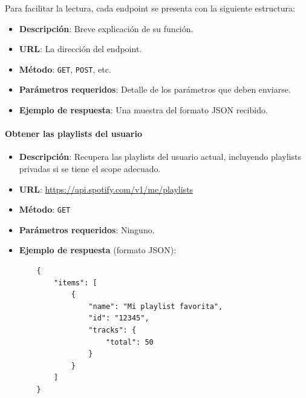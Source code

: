 Para facilitar la lectura, cada endpoint se presenta con la siguiente estructura:
\begin{itemize}
    \item \textbf{Descripción}: Breve explicación de su función.
    \item \textbf{URL}: La dirección del endpoint.
    \item \textbf{Método}: \texttt{GET}, \texttt{POST}, etc.
    \item \textbf{Parámetros requeridos}: Detalle de los parámetros que deben enviarse.
    \item \textbf{Ejemplo de respuesta}: Una muestra del formato JSON recibido.
\end{itemize}

\paragraph{Obtener las playlists del usuario}
\begin{itemize}
    \item \textbf{Descripción}: Recupera las playlists del usuario actual, incluyendo playlists privadas si se tiene el scope adecuado.
    \item \textbf{URL}: \url{https://api.spotify.com/v1/me/playlists}
    \item \textbf{Método}: \texttt{GET}
    \item \textbf{Parámetros requeridos}: Ninguno.
    \item \textbf{Ejemplo de respuesta} (formato JSON):
          \begin{verbatim}
    {
        "items": [
            {
                "name": "Mi playlist favorita",
                "id": "12345",
                "tracks": {
                    "total": 50
                }
            }
        ]
    }
    \end{verbatim}
\end{itemize}





